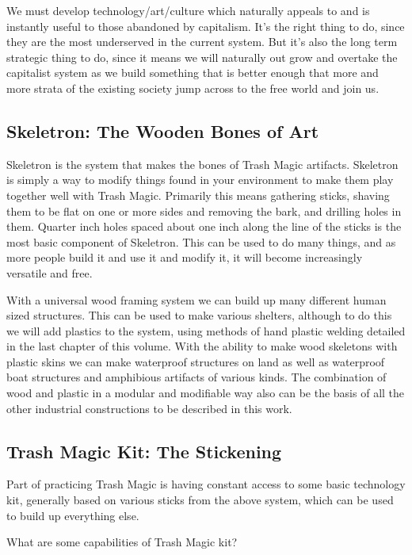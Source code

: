 We must develop technology/art/culture which naturally appeals to and is
instantly useful to those abandoned by capitalism. It's the right thing
to do, since they are the most underserved in the current system. But
it's also the long term strategic thing to do, since it means we will
naturally out grow and overtake the capitalist system as we build
something that is better enough that more and more strata of the
existing society jump across to the free world and join us.

\subsection{Skeletron: The Wooden Bones of
Art}\label{skeletron-the-wooden-bones-of-art}

Skeletron is the system that makes the bones of Trash Magic artifacts.
Skeletron is simply a way to modify things found in your environment to
make them play together well with Trash Magic. Primarily this means
gathering sticks, shaving them to be flat on one or more sides and
removing the bark, and drilling holes in them. Quarter inch holes spaced
about one inch along the line of the sticks is the most basic component
of Skeletron. This can be used to do many things, and as more people
build it and use it and modify it, it will become increasingly versatile
and free.

With a universal wood framing system we can build up many different
human sized structures. This can be used to make various shelters,
although to do this we will add plastics to the system, using methods of
hand plastic welding detailed in the last chapter of this volume. With
the ability to make wood skeletons with plastic skins we can make
waterproof structures on land as well as waterproof boat structures and
amphibious artifacts of various kinds. The combination of wood and
plastic in a modular and modifiable way also can be the basis of all the
other industrial constructions to be described in this work.

\subsection{Trash Magic Kit: The
Stickening}\label{trash-magic-kit-the-stickening}

Part of practicing Trash Magic is having constant access to some basic
technology kit, generally based on various sticks from the above system,
which can be used to build up everything else.

What are some capabilities of Trash Magic kit?

